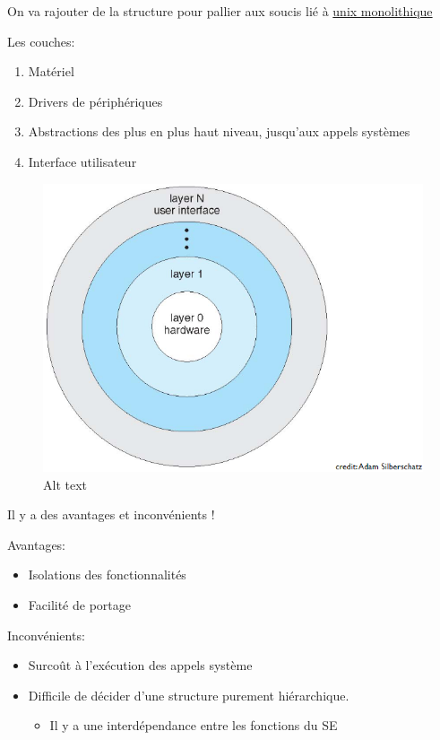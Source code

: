On va rajouter de la structure pour pallier aux soucis lié à
\hyperref[monolithe]{unix monolithique}

Les couches:

\begin{enumerate}
\def\labelenumi{\arabic{enumi}.}
\tightlist
\item
  Matériel
\item
  Drivers de périphériques
\item
  Abstractions des plus en plus haut niveau, jusqu'aux appels systèmes
\item
  Interface utilisateur
\end{enumerate}

\begin{figure}
\centering
\includegraphics{image-19.png}
\caption{Alt text}
\end{figure}

Il y a des avantages et inconvénients !

Avantages:

\begin{itemize}
\tightlist
\item
  Isolations des fonctionnalités
\item
  Facilité de portage
\end{itemize}

Inconvénients:

\begin{itemize}
\tightlist
\item
  Surcoût à l'exécution des appels système
\item
  Difficile de décider d'une structure purement hiérarchique.

  \begin{itemize}
  \tightlist
  \item
    Il y a une interdépendance entre les fonctions du SE
  \end{itemize}
\end{itemize}

